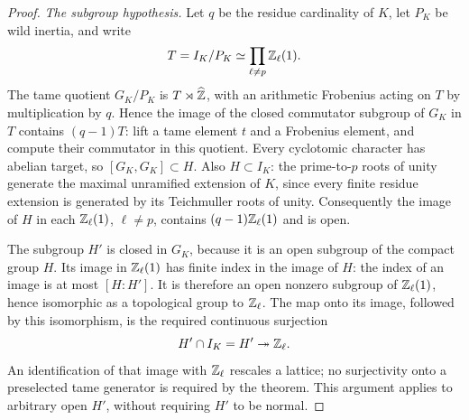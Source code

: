 \begin{proof}
\emph{The subgroup hypothesis.}
Let $q$ be the residue cardinality of $K$, let $P_K$ be wild inertia,
and write
\[
 T=I_K/P_K\simeq\prod_{\ell\ne p}\mathbb Z_\ell(1).
\]
The tame quotient $G_K/P_K$ is $T\rtimes\widehat{\mathbb Z}$, with an
arithmetic Frobenius acting on $T$ by multiplication by $q$. Hence the
image of the closed commutator subgroup of $G_K$ in $T$ contains
$(q-1)T$: lift a tame element $t$ and a Frobenius element, and compute
their commutator in this quotient. Every cyclotomic character has
abelian target, so $[G_K,G_K]\subset H$. Also $H\subset I_K$:
the prime-to-$p$ roots of unity generate the maximal unramified extension
of $K$, since every finite residue extension is generated by its
Teichmuller roots of unity. Consequently the image of $H$ in each
$\mathbb Z_\ell(1)$, $\ell\ne p$, contains
$(q-1)\mathbb Z_\ell(1)$ and is open.

The subgroup $H'$ is closed in $G_K$, because it is an open subgroup of
the compact group $H$. Its image in $\mathbb Z_\ell(1)$ has finite index in
the image of $H$: the index of an image is at most $[H:H']$.
It is therefore an open nonzero subgroup of $\mathbb Z_\ell(1)$, hence
isomorphic as a topological group to $\mathbb Z_\ell$. The map onto its image,
followed by this isomorphism, is the required continuous surjection
\[
 H'\cap I_K=H'\twoheadrightarrow\mathbb Z_\ell.
\]
An identification of that image with $\mathbb Z_\ell$ rescales a lattice; no
surjectivity onto a preselected tame generator is required by the
theorem. This argument applies to arbitrary open $H'$, without requiring
$H'$ to be normal.


\end{proof}
